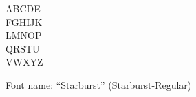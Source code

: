 \documentclass[a4paper]{article}
\begin{document}
\begin{center}
\fontsize{60pt}{72pt}
  ABCDE \\
  FGHIJK \\
  LMNOP \\
  QRSTU \\
  VWXYZ \\
\end{center}
\vfill
\begin{center}
Font name: ``Starburst'' (Starburst-Regular)
\end{center}
\end{document}

